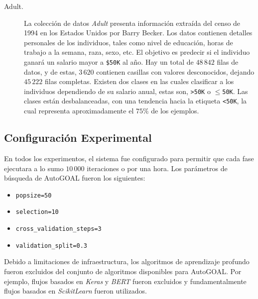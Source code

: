 \begin{description}
\item[Adult.]
La colección de datos \emph{Adult} \parencite{ucidata} presenta información extraída del censo de 1994 en los Estados Unidos por Barry Becker.
Los datos contienen detalles personales de los individuos, tales como nivel de educación, horas de trabajo a la semana, raza, sexo, etc.
El objetivo es predecir si el individuo ganará un salario mayor a \texttt{\$50K} al año.
Hay un total de $48\,842$ filas de datos, y de estas, $3\,620$ contienen casillas con valores desconocidos, dejando $45\,222$ filas completas.
Existen dos clases en las cuales clasificar a los individuos dependiendo de su salario anual, estas son, \texttt{>50K} o \texttt{$\leq$50K}.
Las clases están desbalanceadas, con una tendencia hacia la etiqueta \texttt{<50K}, la cual representa aproximadamente el $75\%$ de los ejemplos.

\end{description}

\subsection{Configuración Experimental}\label{section:experimental-setup}

En todos los experimentos, el sistema fue configurado para permitir que cada fase ejecutara a lo sumo $10\,000$ iteraciones o por una hora.
Los parámetros de búsqueda de AutoGOAL fueron los siguientes:
\begin{itemize}
    \item \texttt{popsize=50}
    \item \texttt{selection=10}
    \item \texttt{cross\_validation\_steps=3}
    \item \texttt{validation\_split=0.3}
\end{itemize}

Debido a limitaciones de infraestructura, los algoritmos de aprendizaje profundo fueron excluidos del conjunto de algoritmos disponibles para AutoGOAL.
Por ejemplo, flujos basados en \emph{Keras} y \emph{BERT} fueron excluidos y fundamentalmente flujos basados en \emph{ScikitLearn} fueron utilizados.

